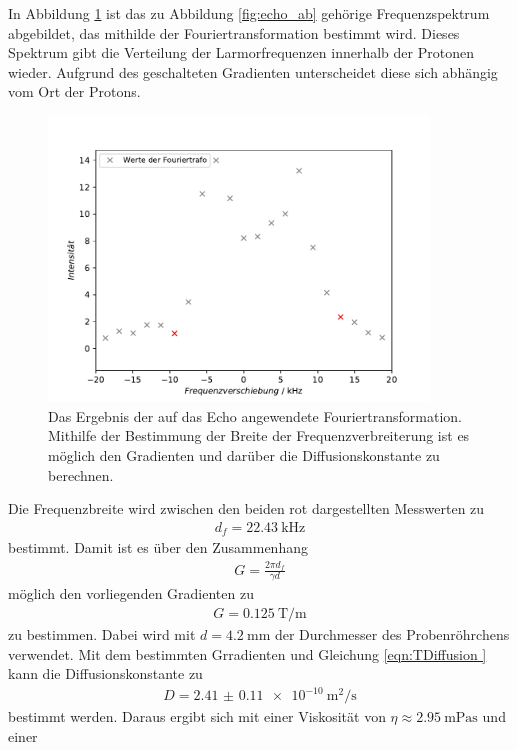 In Abbildung \ref{fig:ft} ist das zu Abbildung \ref{fig:echo_ab} gehörige Frequenzspektrum abgebildet, das mithilde der 
Fouriertransformation bestimmt wird. Dieses Spektrum gibt die Verteilung der Larmorfrequenzen innerhalb der Protonen wieder.
Aufgrund des geschalteten Gradienten unterscheidet diese sich abhängig vom Ort der Protons.
\begin{figure}[H]
  \centering
  \includegraphics[width=0.9\textwidth]{../Auswertung/echo_ft.pdf}
  \caption{Das Ergebnis der auf das Echo angewendete Fouriertransformation. Mithilfe der Bestimmung der Breite der Frequenzverbreiterung
  ist es möglich den Gradienten und darüber die Diffusionskonstante zu berechnen.}
  \label{fig:ft}
\end{figure} \noindent
Die Frequenzbreite wird zwischen den beiden rot dargestellten Messwerten zu
\begin{align}
  d_f = \SI{22.43}{\kilo\hertz}
\end{align}
bestimmt.
Damit ist es über den Zusammenhang
\begin{align}
  G = \frac{2\pi d_f}{\gamma d}
\end{align}
möglich den vorliegenden Gradienten zu
\begin{align}
  G = \SI{0.125}{\tesla\per\meter}
\end{align}
zu bestimmen. Dabei wird mit $d = \SI{4.2}{\milli\meter}$ der Durchmesser des Probenröhrchens verwendet.
Mit dem bestimmten Grradienten und Gleichung \ref{eqn:TDiffusion } kann die Diffusionskonstante zu 
\begin{align}
  D = \SI{2.41(011)e-10}{\square\meter\per\second}
\end{align}
bestimmt werden.
Daraus ergibt sich mit einer Viskosität von $\eta \approx \SI{2.95}{\milli\pascal\second}$ \cite{viso} und einer 
